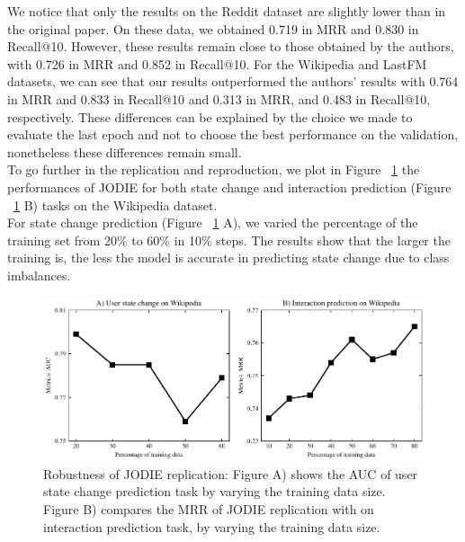 We notice that only the results on the Reddit dataset are slightly lower than in the original paper. On these data, we obtained 0.719 in MRR and 0.830 in Recall@10. However, these results remain close to those obtained by the authors, with 0.726 in MRR and 0.852 in Recall@10. For the Wikipedia and LastFM datasets, we can see that our results outperformed the authors' results with 0.764 in MRR and 0.833 in Recall@10 and 0.313 in MRR, and 0.483 in Recall@10, respectively. These differences can be explained by the choice we made to evaluate the last epoch and not to choose the best performance on the validation, nonetheless these differences remain small.\\



To go further in the replication and reproduction, we plot in Figure ~\ref{percentage-train} the performances of JODIE for both state change and  interaction prediction (Figure ~\ref{percentage-train} B) tasks on the Wikipedia dataset. \\
For state change prediction  (Figure ~\ref{percentage-train}  A), we varied the percentage of the training set from 20\% to 60\% in 10\% steps. The results show that the larger the training is, the less the model is accurate in predicting state change due to class imbalances. 

\begin{figure}[htbp]
    \centering
    \includegraphics[width = \textwidth]{image/percentage_train.pdf}
    \caption{Robustness of JODIE replication: Figure A) shows the AUC of user state change prediction task by varying the training data size.  Figure B) compares the MRR of JODIE replication with on interaction prediction task, by varying the training data size. }
    \label{percentage-train}
\end{figure}

